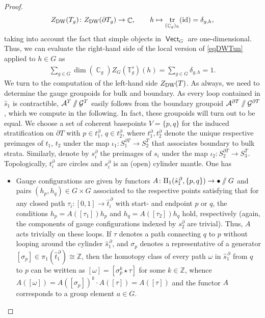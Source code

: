 \documentclass[pdftex]{sigma}
\DeclareMathOperator{\id}{id}
\DeclareMathOperator{\tr}{tr}
\DeclareMathOperator{\vect}{\mathsf{Vect}}
\DeclareMathOperator{\C}{\mathbb{C}}
\newcommand{\sslash}{\mathbin{/\mkern-6mu/}}
\numberwithin{equation}{section}
\theoremstyle{definition}
\begin{document}
\begin{proof}
 \begin{align*}
 Z_{\rm DW}(T_g)\colon Z_{\rm DW}(\partial T_g) \rightarrow \C , \qquad h \mapsto \tr_{(\C_g)_h}(\id) = \delta_{g,h},
 \end{align*}
 taking into account the fact that simple objects in $\vect_G$ are one-dimensional. Thus, we can evaluate the right-hand side of the local version of \eqref{eqDWTun} applied to $h \in G$ as
 \begin{align}
 \label{eqSoS}
 \sum_{g \in G} \dim (\C_g)Z_G(\mathbb{T}_g^s)(h) = \sum_{g \in G} \delta_{g,h} = 1.
 \end{align}
 We turn to the computation of the left-hand side $Z_{\rm DW}(T)$. As always, we need to determine the gauge groupoids for bulk and boundary. As every loop contained in $\hat{s}_1$ is contractible, $\mathcal{A}^T \sslash \mathcal{G}^T$ easily follows from the boundary groupoid $\mathcal{A}^{\partial T} \sslash \mathcal{G}^{\partial T}$, which we compute in the following. In fact, these groupoids will turn out to be equal. We choose a set of coherent basepoints $V = \{p, q\}$ for the induced stratification on $\partial T$ with $p \in t_1^{\partial}$, $q \in t_2^{\partial}$, where $t_1^{\partial}, t_2^{\partial}$ denote the unique respective preimages of $t_1$, $t_2$ under the map $\iota_1\colon S_1^{\partial T} \rightarrow S_2^T$ that associates boundary to bulk strata. Similarly, denote by $s_i^{\partial}$ the preimages of $s_i$ under the map $\iota_2\colon S_2^{\partial T} \rightarrow S_3^T$. Topologically, $t_i^{\partial}$ are circles and $s_i^{\partial}$ is an (open) cylinder mantle. One has
 \begin{itemize}\itemsep=0pt
 \item Gauge configurations are given by functors $A\colon \Pi_1(\hat{s}_1^{\, \partial}, \{p,q\}) \rightarrow \bullet \sslash G$ and pairs $(h_p, h_q) \in G \times G$ associated to the respective points satisfying that for any closed path $\tau_i\colon [0,1] \rightarrow \hat{t}_i^{ \, \partial}$ with start- and endpoint $p$ or $q$, the conditions $h_p = A([\tau_1])h_p$ and $h_q = A([\tau_2])h_q$ hold, respectively (again, the components of gauge configurations indexed by $s_2^{\partial}$ are trivial). Thus, $A$ acts trivially on these loops. If $\tau$ denotes a path connecting $q$ to $p$ without looping around the cylinder $\hat{s}_1^{\, \partial}$, and $\sigma_p$ denotes a representative of a generator $[\sigma_p] \in \pi_1(\hat{t}_1^{\, \partial}) \cong \mathbb{Z}$, then the homotopy class of every path $\omega$ in $\hat{s}_1^{\, \partial}$ from $q$ to $p$ can be written as $[\omega] = [\sigma_p^k \star \tau]$ for some $k \in \mathbb{Z}$, whence $A([\omega]) = A([\sigma_p])^k \cdot A([\tau]) = A([\tau])$ and the functor $A$ corresponds to a group element $a \in G$.

\end{itemize}
\end{proof}
\end{document}
